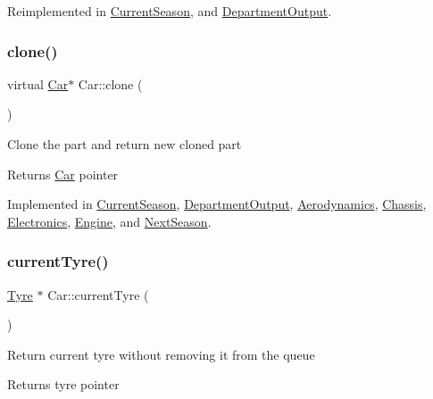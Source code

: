 Reimplemented in \hyperlink{classCurrentSeason_af605da3db8d851b07265951e5945669c}{Current\+Season}, and \hyperlink{classDepartmentOutput_a34d5c432ee7e7e8a33a4e8099a2c751f}{Department\+Output}.

\mbox{\label{classCar_a5a54bbfe8e72022f4d9fdf6ecc990d99}} 
\subsubsection{\texorpdfstring{clone()}{clone()}}
{\footnotesize\ttfamily virtual \hyperlink{classCar}{Car}$\ast$ Car\+::clone (\begin{DoxyParamCaption}{ }\end{DoxyParamCaption})\hspace{0.3cm}{\ttfamily [pure virtual]}}

Clone the part and return new cloned part \begin{DoxyReturn}{Returns}
\hyperlink{classCar}{Car} pointer 
\end{DoxyReturn}


Implemented in \hyperlink{classCurrentSeason_afaed34051750fdd603784e6ea7809075}{Current\+Season}, \hyperlink{classDepartmentOutput_ab20c9d559bca6ce8e6748dfac47c3f84}{Department\+Output}, \hyperlink{classAerodynamics_abbd7bb0e8186e3d86b8baf7a72aeb63e}{Aerodynamics}, \hyperlink{classChassis_a2700ee5437760643c7cad46e077dcbcd}{Chassis}, \hyperlink{classElectronics_a292164aedff12771f4f05af648a9fc70}{Electronics}, \hyperlink{classEngine_a18a3b9d950e67a868420b79890ba1428}{Engine}, and \hyperlink{classNextSeason_a79d36fb105db8d21293f905a7e3a78bd}{Next\+Season}.

\mbox{\label{classCar_aadd6f69cf389b293a5e8a098ebc75f1d}} 
\subsubsection{\texorpdfstring{current\+Tyre()}{currentTyre()}}
{\footnotesize\ttfamily \hyperlink{classTyre}{Tyre} $\ast$ Car\+::current\+Tyre (\begin{DoxyParamCaption}{ }\end{DoxyParamCaption})\hspace{0.3cm}{\ttfamily [virtual]}}

Return current tyre without removing it from the queue \begin{DoxyReturn}{Returns}
tyre pointer 
\end{DoxyReturn}


